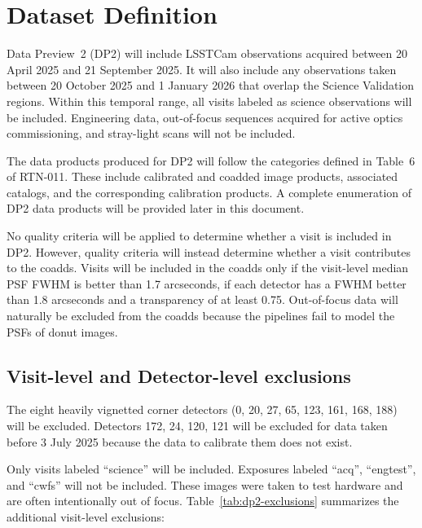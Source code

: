 \section{Dataset Definition}
\label{sec:dataset}

Data Preview~2 (DP2) will include LSSTCam observations acquired between 20 April 2025 and 21 September 2025.
It will also include any observations taken between 20 October 2025 and 1 January 2026 that overlap the Science Validation regions.
Within this temporal range, all visits labeled as science observations will be included.
Engineering data, out-of-focus sequences acquired for active optics commissioning, and stray-light scans will not be included.

The data products produced for DP2 will follow the categories defined in Table~6 of RTN-011.
These include calibrated and coadded image products, associated catalogs, and the corresponding calibration products.
A complete enumeration of DP2 data products will be provided later in this document.

No quality criteria will be applied to determine whether a visit is included in DP2.
However, quality criteria will instead determine whether a visit contributes to the coadds.
Visits will be included in the coadds only if the visit-level median PSF FWHM  is better than 1.7 arcseconds,  if each detector has a FWHM better than 1.8 arcseconds and a transparency of at least 0.75.
Out-of-focus data will naturally be excluded from the coadds because the pipelines fail to model the PSFs of donut images.

\subsection{Visit-level and Detector-level exclusions}
The eight heavily vignetted corner detectors  (0, 20, 27, 65, 123, 161, 168, 188) will be excluded.
Detectors 172, 24,  120, 121 will be excluded for data taken before 3 July 2025 because the data to calibrate them does not exist.

Only visits labeled ``science'' will be included.
Exposures labeled ``acq'', ``engtest'', and ``cwfs'' will not be included.
These images were taken to test hardware and are often intentionally out of focus.
Table~\ref{tab:dp2-exclusions} summarizes the additional visit-level exclusions:


